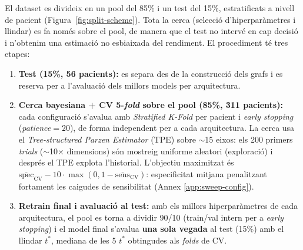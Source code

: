 \documentclass[10pt,a4paper,twocolumn,twoside]{article}
\begin{document}
El dataset es divideix en un pool del 85\% i un test del 15\%, estratificats a
nivell de pacient (Figura~\ref{fig:split-scheme}). Tota la cerca (selecció d'hiperparàmetres i
llindar) es fa només sobre el pool, de manera que el test no intervé en cap decisió i n'obtenim una
estimació no esbiaixada del rendiment. El procediment té tres etapes:

\begin{enumerate}\itemsep1pt
  \item \textbf{Test (15\%, 56 pacients):} es separa des de la construcció dels grafs i es reserva
        per a l'avaluació dels millors models per arquitectura.
  \item \textbf{Cerca bayesiana + CV 5-\textit{fold} sobre el pool (85\%, 311 pacients):} cada
        configuració s'avalua amb \textit{Stratified K-Fold} per pacient i \textit{early stopping}
        (\textit{patience}$=\!20$), de forma independent per a cada arquitectura. La cerca usa el
        \textit{Tree-structured Parzen Estimator} (TPE) sobre $\sim$15 eixos: els 200 primers
        \textit{trials} ($\sim$10$\times$ dimensions) són mostreig uniforme aleatori (exploració) i
        després el TPE explota l'historial. L'objectiu maximitzat és
        $\overline{\text{spec}}_{\text{CV}} - 10\cdot\max(0, 1-\overline{\text{sens}}_{\text{CV}})$:
        especificitat mitjana penalitzant fortament les caigudes de sensibilitat (Annex
        \ref{app:sweep-config}).
  \item \textbf{Retrain final i avaluació al test:} amb els millors hiperparàmetres de cada
        arquitectura, el pool es torna a dividir 90/10 (train/val intern per a \textit{early stopping})
        i el model final s'avalua \textbf{una sola vegada} al test (15\%) amb el llindar $t^*$,
        mediana de les 5 $t^*$ obtingudes als \textit{folds} de CV.
\end{enumerate}
\end{document}
